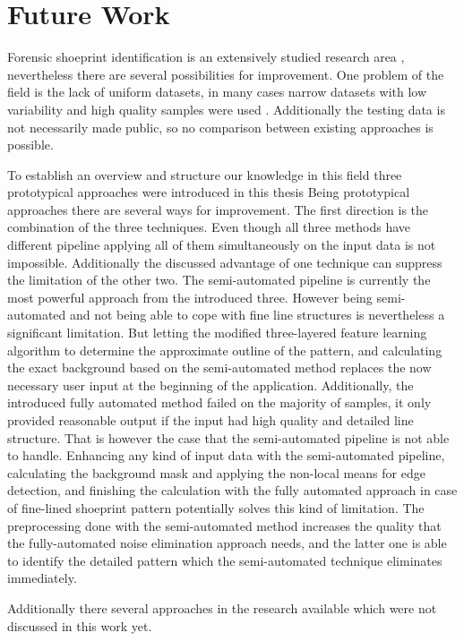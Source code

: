 \documentclass[draft,final]{vutinfth} %
\begin{document}
\chapter{Future Work}
\par
Forensic shoeprint identification is an extensively studied research area \cite{rida2019forensic}, nevertheless there are several possibilities for improvement.
One problem of the field is the lack of uniform datasets, in many cases narrow datasets with low variability and high quality samples were used  \cite{rida2019forensic}.
Additionally the testing data is not necessarily made public, so no comparison between existing approaches is possible.
\par
To establish an overview and structure our knowledge in this field three prototypical approaches were introduced in this thesis
Being prototypical approaches there are several ways for improvement.
The first direction is the combination of the three techniques.
Even though all three methods have different pipeline applying all of them simultaneously on the input data is not impossible.
Additionally the discussed advantage of one technique can suppress the limitation of the other two.
The semi-automated pipeline is currently the most powerful approach from the introduced three.
However being semi-automated and not being able to cope with fine line structures is nevertheless a significant limitation.
But letting the modified three-layered feature learning algorithm to determine the approximate outline of the pattern, and calculating the exact background based on the semi-automated method replaces the now necessary user input at the beginning of the application.
Additionally, the introduced fully automated method failed on the majority of samples, it only provided reasonable output if the input had high quality and detailed line structure.
That is however the case that the semi-automated pipeline is not able to handle.
Enhancing any kind of input data with the semi-automated pipeline, calculating the background mask and applying the non-local means for edge detection, and finishing the calculation with the fully automated approach in case of fine-lined shoeprint pattern potentially solves this kind of limitation.
The preprocessing done with the semi-automated method increases the quality that the fully-automated noise elimination approach needs, and the latter one is able to identify the detailed pattern which the semi-automated technique eliminates immediately.
\par
Additionally there several approaches in the research available which were not discussed in this work yet.
\end{document}
